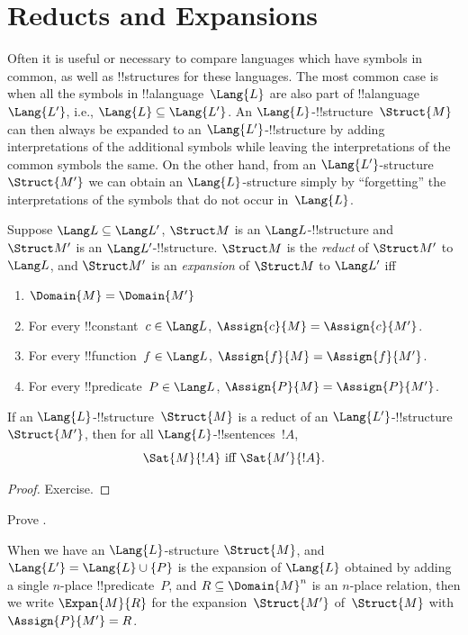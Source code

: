 \documentclass[../../../include/open-logic-section]{subfiles}
\begin{document}
\section{Reducts and Expansions}

Often it is useful or necessary to compare languages which have
symbols in common, as well as !!{structure}s for these languages.  The
most common case is when all the symbols in !!a{language}~$\Lang{L}$
are also part of !!a{language}~$\Lang{L'}$, i.e., $\Lang{L} \subseteq
\Lang{L'}$. An $\Lang{L}$-!!{structure}~$\Struct{M}$ can then always
be expanded to an $\Lang{L'}$-!!{structure} by adding interpretations
of the additional symbols while leaving the interpretations of the
common symbols the same.  On the other hand, from an
$\Lang{L'}$-structure~$\Struct{M'}$ we can obtain an
$\Lang{L}$-structure simply by ``forgetting'' the interpretations of
the symbols that do not occur in~$\Lang{L}$.

\begin{defn}
Suppose $\Lang L \subseteq \Lang L'$, $\Struct M$ is an
$\Lang L$-!!{structure} and $\Struct M'$ is an $\Lang L'$-!!{structure}.
$\Struct M$ is the \emph{reduct} of $\Struct M'$ to $\Lang L$, and
$\Struct M'$ is an \emph{expansion} of $\Struct M$ to $\Lang L'$ iff
\begin{enumerate}
\item $\Domain{M} = \Domain{M'}$
\item For every !!{constant}~$c \in \Lang L$, $\Assign{c}{M} =
  \Assign{c}{M'}$.
\item For every !!{function}~$f \in \Lang L$, $\Assign{f}{M} =
  \Assign{f}{M'}$.
\item For every !!{predicate}~$P \in \Lang L$, $\Assign{P}{M} =
  \Assign{P}{M'}$.
\end{enumerate}
\end{defn}

\begin{prop}
If an $\Lang{L}$-!!{structure}~$\Struct{M}$ is a reduct of an
$\Lang{L'}$-!!{structure}~$\Struct{M'}$, then for all
$\Lang{L}$-!!{sentence}s~$!A$,
\[
\Sat{M}{!A} \text{ iff } \Sat{M'}{!A}.
\]
\end{prop}

\begin{proof}
  Exercise.
\end{proof}

\begin{prob}
Prove .
\end{prob}

\begin{defn}
When we have an $\Lang{L}$-structure $\Struct{M}$, and $\Lang{L'} =
\Lang{L} \cup \{P\}$ is the expansion of $\Lang{L}$ obtained by adding
a single $n$-place !!{predicate}~$P$, and $R \subseteq \Domain{M}^n$
is an $n$-place relation, then we write $\Expan{M}{R}$ for the
expansion~$\Struct{M'}$ of~$\Struct{M}$ with $\Assign{P}{M'} = R$.
\end{defn}
\end{document}
